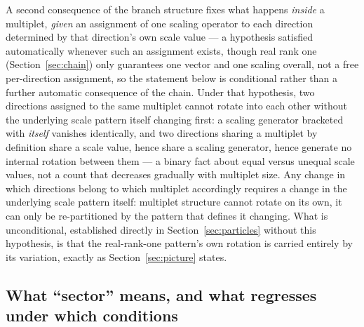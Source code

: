 \documentclass[aps,prd,twocolumn,superscriptaddress,nofootinbib]{revtex4-2}
\begin{document}
A second consequence of the branch structure fixes what happens
\emph{inside} a multiplet, \emph{given} an assignment of one scaling
operator to each direction determined by that direction's own scale
value — a hypothesis satisfied automatically whenever such an
assignment exists, though real rank one (Section~\ref{sec:chain}) only
guarantees one vector and one scaling overall, not a free per-direction
assignment, so the statement below is conditional rather than a further
automatic consequence of the chain. Under that hypothesis, two
directions assigned to the same multiplet cannot rotate into each other
without the underlying scale pattern itself changing first: a scaling
generator bracketed with \emph{itself} vanishes identically, and two
directions sharing a multiplet by definition share a scale value, hence
share a scaling generator, hence generate no internal rotation between
them — a binary fact about equal versus unequal scale values, not a
count that decreases gradually with multiplet size. Any change in which
directions belong to which multiplet accordingly requires a change in
the underlying scale pattern itself: multiplet structure cannot rotate
on its own, it can only be re-partitioned by the pattern that defines it
changing. What is unconditional, established directly in
Section~\ref{sec:particles} without this hypothesis, is that the
real-rank-one pattern's own rotation is carried entirely by its
variation, exactly as Section~\ref{sec:picture} states.

\subsection{What ``sector'' means, and what regresses under which conditions}\label{ss:sectors}
\end{document}
